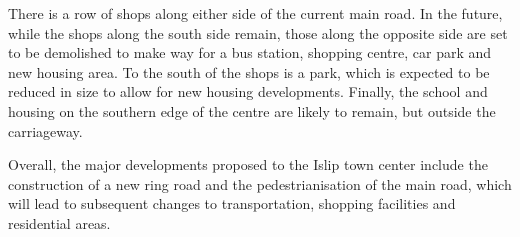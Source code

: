 \documentclass[conference]{IEEEtran}
\begin{document}
There is a row of shops along either side of the current main road. 
In the future, while the shops along the south side remain, those along the opposite side are set
to be demolished to make way for a bus station, shopping centre, car park and new housing area. 
To the south of the shops is a park, which is expected to be reduced in size to allow for new housing developments. 
Finally, the school and housing on the southern edge of the centre are likely to remain, but outside the carriageway.

Overall, the major developments proposed to the Islip town center include the construction of a new ring road and the pedestrianisation of the main road, 
which will lead to subsequent changes to transportation, shopping facilities and residential areas.
\end{document}
